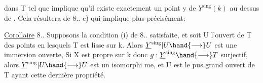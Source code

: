

dans T tel que \hand{$\xi$}   implique qu'il existe exactement  un point  y de
$\underline{Y}^{\text{sing}}(k)$ au dessus de \hand{$\xi$}. Cela résultera de 8.. c) qui implique plus
 précisément:

\uline{Corollaire} 8..  Supposons la condition (i) de 8.. satisfaite, et
soit  
U l'ouvert de T des points en lesquels T est lisse sur k. Alors 
$\underline{Y}^{\text{sing}}|U \hand{\longrightarrow} U$ est une immersion ouverte,  
 Si X est propre sur
k donc $g:\underline{Y}^{\text{sing}}\hand{\longrightarrow} T$ surjectif, alors $\underline{Y}^{\text{sing}}|U\hand{\longrightarrow} U$ est un isomorphi
me, et U est le pus grand ouvert de T ayant cette dernière propriété.

